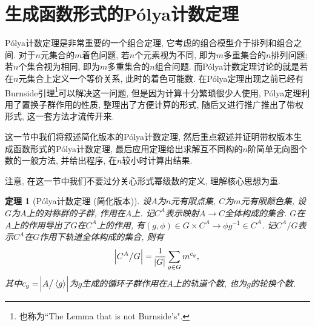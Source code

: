 \documentclass[chinese]{assignment}[2019/10/15]
\theoremstyle{plain}
\newtheorem{theorem}{定理}[section]
\newcommand{\Polya}{P\'{o}lya}
\begin{document}
    \section{生成函数形式的\Polya 计数定理}

    \Polya 计数定理是非常重要的一个组合定理, 它考虑的组合模型介于排列和组合之间. 对于$n$元集合的$m$着色问题, 若$n$个元素视为不同, 即为$m$多重集合的$n$排列问题; 若$n$个集合视为相同, 即为$m$多重集合的$n$组合问题. 而\Polya 计数定理讨论的就是若在$n$元集合上定义一个等价关系, 此时的着色可能数. 在\Polya 定理出现之前已经有Burnside引理\footnote{也称为``The Lemma that is not Burnside's".}可以解决这一问题, 但是因为计算十分繁琐很少人使用, \Polya 定理利用了置换子群作用的性质, 整理出了方便计算的形式, 随后又进行推广推出了带权形式, 这一套方法才流传开来.

    这一节中我们将叙述简化版本的\Polya 计数定理, 然后重点叙述并证明带权版本生成函数形式的\Polya 计数定理, 最后应用定理给出求解互不同构的$n$阶简单无向图个数的一般方法, 并给出程序, 在$n$较小时计算出结果.

    注意, 在这一节中我们不要过分关心形式幂级数的定义, 理解核心思想为重.

    \begin{theorem}[\Polya 计数定理 (简化版本)]
        设$A$为$n$元有限点集, $C$为$m$元有限颜色集, 设$G$为$A$上的对称群的子群, 作用在$A$上. 记$C^A$表示映射$A\to C$全体构成的集合. $G$在$A$上的作用导出了$G$在$C^A$上的作用, 有$(g, \phi)\in G\times C^A\to \phi g^{-1}\in C^A$. 记$C^A\big/G$表示$C^A$在$G$作用下轨道全体构成的集合, 则有
        \begin{equation}
            \abs{C^A\big/G} = \frac{1}{\abs{G}}\sum_{g\in G}m^{c_g},
        \end{equation}
        其中$c_g = \abs{A\big/\left<g\right>}$为$g$生成的循环子群作用在$A$上的轨道个数, 也为$g$的轮换个数.
    \end{theorem}
\end{document}
